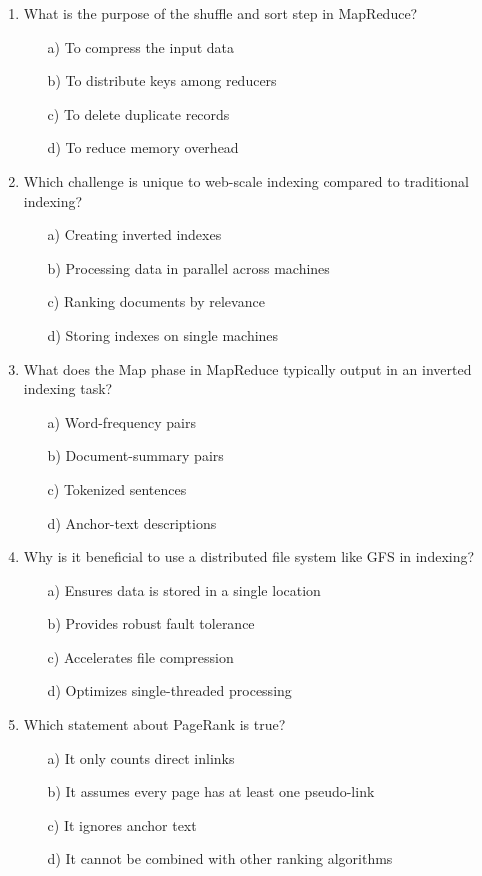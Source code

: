 \documentclass[8pt]{extarticle}
\begin{document}
\begin{multicols}{2}
\begin{enumerate}
\item What is the purpose of the shuffle and sort step in MapReduce?
\begin{itemize}
\item[a)] To compress the input data
\item[b)] To distribute keys among reducers
\item[c)] To delete duplicate records
\item[d)] To reduce memory overhead
\end{itemize}

\item Which challenge is unique to web-scale indexing compared to traditional indexing?
\begin{itemize}
\item[a)] Creating inverted indexes
\item[b)] Processing data in parallel across machines
\item[c)] Ranking documents by relevance
\item[d)] Storing indexes on single machines
\end{itemize}

\item What does the Map phase in MapReduce typically output in an inverted indexing task?
\begin{itemize}
\item[a)] Word-frequency pairs
\item[b)] Document-summary pairs
\item[c)] Tokenized sentences
\item[d)] Anchor-text descriptions
\end{itemize}

\item Why is it beneficial to use a distributed file system like GFS in indexing?
\begin{itemize}
\item[a)] Ensures data is stored in a single location
\item[b)] Provides robust fault tolerance
\item[c)] Accelerates file compression
\item[d)] Optimizes single-threaded processing
\end{itemize}

\item Which statement about PageRank is true?
\begin{itemize}
\item[a)] It only counts direct inlinks
\item[b)] It assumes every page has at least one pseudo-link
\item[c)] It ignores anchor text
\item[d)] It cannot be combined with other ranking algorithms
\end{itemize}


\end{enumerate}
\end{multicols}
\end{document}
